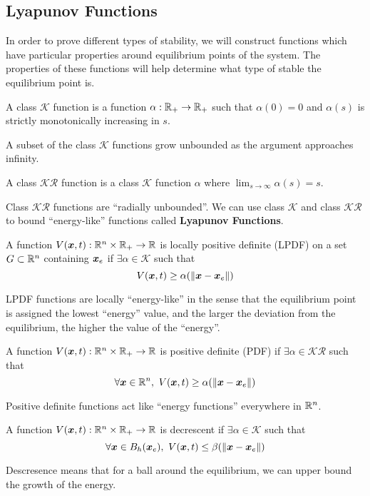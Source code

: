 \subsection{Lyapunov Functions}
In order to prove different types of stability, we will construct functions
which have particular properties around equilibrium points of the system. The
properties of these functions will help determine what type of stable the
equilibrium point is.
\begin{definition}
	A class $\mathcal{K}$ function is a function $\alpha: \mathbb{R}_+ \to \mathbb{R}_+$ such that
	$\alpha(0) = 0$ and $\alpha(s)$ is strictly monotonically increasing in $s$.
	\label{defn:class-k-function}
\end{definition}
A subset of the class $\mathcal{K}$ functions grow unbounded as the argument
approaches infinity.
\begin{definition}
	A class $\mathcal{KR}$ function is a class $\mathcal{K}$ function $\alpha$
	where $\lim_{s\to\infty}\alpha(s) = s$.
	\label{defn:class-kr-function}
\end{definition}
Class $\mathcal{KR}$ functions are ``radially unbounded''.
We can use class $\mathcal{K}$ and class $\mathcal{KR}$ to bound ``energy-like''
functions called \textbf{Lyapunov Functions}.
\begin{definition}
	A function $V(\boldsymbol{x}, t): \mathbb{R}^n \times \mathbb{R}_+ \to \mathbb{R}$ is locally positive
	definite (LPDF) on a set $G\subset \mathbb{R}^n$ containing $\boldsymbol{x}_e$ if $\exists
	\alpha \in \mathcal{K}$ such that \[
		V(\boldsymbol{x}, t) \geq \alpha(\|\boldsymbol{x} - \boldsymbol{x}_e\|)
	\]
	\label{defn:lpdf}
\end{definition}
LPDF functions are locally ``energy-like'' in the sense that the equilibrium
point is assigned the lowest ``energy'' value, and the larger the deviation from
the equilibrium, the higher the value of the ``energy''.
\begin{definition}
	A function $V(\boldsymbol{x}, t): \mathbb{R}^n \times \mathbb{R}_+ \to \mathbb{R}$ is positive
	definite (PDF) if $\exists
	\alpha \in \mathcal{KR}$ such that \[
		\forall \boldsymbol{x}\in\mathbb{R}^n,\ V(\boldsymbol{x}, t) \geq \alpha(\|\boldsymbol{x} - \boldsymbol{x}_e\|)
	\]
	\label{defn:pdf}
\end{definition}
Positive definite functions act like ``energy functions'' everywhere in $\mathbb{R}^n$.
\begin{definition}
	A function $V(\boldsymbol{x}, t): \mathbb{R}^n \times \mathbb{R}_+ \to \mathbb{R}$ is decrescent
	if $\exists
	\alpha \in \mathcal{K}$ such that \[
		\forall \boldsymbol{x}\in B_h(\boldsymbol{x}_e),\ V(\boldsymbol{x}, t) \leq \beta(\|\boldsymbol{x} - \boldsymbol{x}_e\|)
	\]
	\label{defn:decrescent}
\end{definition}
Descresence means that for a ball around the equilibrium, we can upper bound the
growth of the energy.

